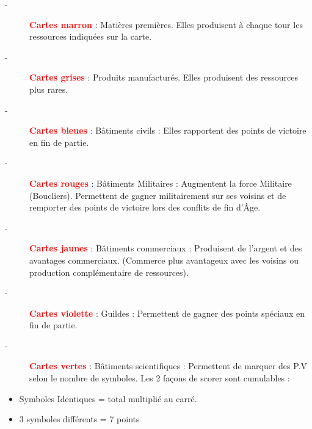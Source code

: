 \documentclass{scrartcl}%
\begin{document}
%
\begin{description}%
\item[{-} ]%
%
\textcolor{red}{%
\textbf{Cartes marron}%
}%
\textit{ }%
 : Matières premières. Elles produisent à chaque tour les ressources indiquées sur la carte.
%
\item[{-} ]%
%
\textcolor{red}{%
\textbf{Cartes grises}%
}%
\textit{ }%
 : Produits manufacturés. Elles produisent des ressources plus rares.
%
\item[{-} ]%
%
\textcolor{red}{%
\textbf{Cartes bleues}%
}%
\textit{ }%
 : Bâtiments civils : Elles rapportent des points de victoire en fin de partie.
%
\item[{-} ]%
%
\textcolor{red}{%
\textbf{Cartes rouges}%
}%
\textit{ }%
 : Bâtiments Militaires : Augmentent la force Militaire (Boucliers). Permettent de gagner militairement sur ses voisins et de remporter des points de victoire lors des conflits de fin d’Âge.
%
\item[{-} ]%
%
\textcolor{red}{%
\textbf{Cartes jaunes}%
}%
\textit{ }%
 : Bâtiments commerciaux : Produisent de l’argent et des avantages commerciaux. (Commerce plus avantageux avec les voisins ou production complémentaire de ressources).
%
\item[{-} ]%
%
\textcolor{red}{%
\textbf{Cartes violette}%
}%
\textit{ }%
 : Guildes : Permettent de gagner des points spéciaux en fin de partie.
%
\item[{-} ]%
%
\textcolor{red}{%
\textbf{Cartes vertes}%
}%
\textit{ }%
 : Bâtiments scientifiques : Permettent de marquer des P.V selon le nombre de symboles. Les 2 façons de scorer sont cumulables :
%
\end{description}%
\begin{itemize}%
\item%
%
 Symboles Identiques = total multiplié au carré.
%
\item%
%
 3 symboles différents = 7 points
%
\end{itemize}

%
\sectionfont{\color{cyan}}%
\subsectionfont{\color{cyan}}%
\subsubsectionfont{\color{cyan}}%
\end{document}
